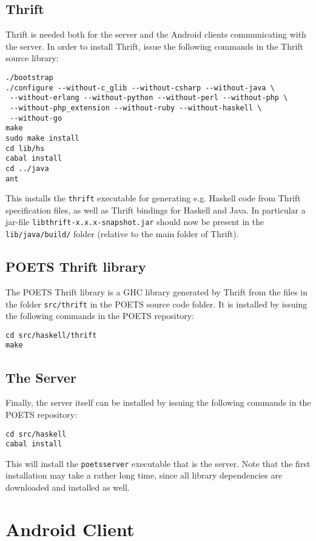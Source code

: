 \documentclass[10pt,final]{article}
\begin{document}
\subsection{Thrift}
Thrift is needed both for the server and the Android clients
communicating with the server. In order to install Thrift, issue the
following commands in the Thrift source library:
\begin{verbatim}
./bootstrap
./configure --without-c_glib --without-csharp --without-java \
 --without-erlang --without-python --without-perl --without-php \
 --without-php_extension --without-ruby --without-haskell \
 --without-go
make
sudo make install
cd lib/hs
cabal install
cd ../java
ant
\end{verbatim}

This installs the \verb|thrift| executable for generating e.g. Haskell
code from Thrift specification files, as well as Thrift bindings for
Haskell and Java. In particular a jar-file
\verb|libthrift-x.x.x-snapshot.jar| should now be present in the
\verb|lib/java/build/| folder (relative to the main folder of Thrift).

\subsection{POETS Thrift library}
The POETS Thrift library is a GHC library generated by Thrift from the
files in the folder \verb|src/thrift| in the POETS source code
folder. It is installed by issuing the following commands in the POETS
repository:
\begin{verbatim}
cd src/haskell/thrift
make
\end{verbatim}

\subsection{The Server}
Finally, the server itself can be installed by issuing the following
commands in the POETS repository:
\begin{verbatim}
cd src/haskell
cabal install
\end{verbatim}
This will install the \verb|poetsserver| executable that is the
server. Note that the first installation may take a rather long time,
since all library dependencies are downloaded and installed as
well.

\section{Android Client}
\end{document}
